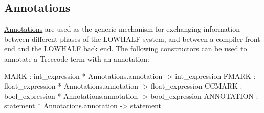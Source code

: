 \subsection{Annotations}
\href{annotations.html}{Annotations} are used as the generic mechanism for
exchanging information between different phases of the LOWHALF system, and
between a compiler front end and the LOWHALF back end.
The following constructors can be used to annotate a Treecode term with
an annotation:
\begin{SML}
   MARK : int_expression * Annotations.annotation -> int_expression
   FMARK : float_expression * Annotations.annotation -> float_expression
   CCMARK : bool_expression * Annotations.annotation -> bool_expression 
   ANNOTATION : statement * Annotations.annotation -> statement
\end{SML}
